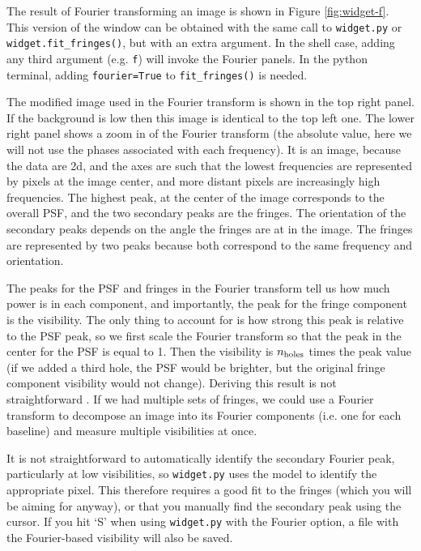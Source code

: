 \documentclass[11pt]{article}
\begin{document}
The result of Fourier transforming an image is shown in Figure \ref{fig:widget-f}. This version of the window can be obtained with the same call to \texttt{widget.py} or \texttt{widget.fit\_fringes()}, but with an extra argument. In the shell case, adding any third argument (e.g. \texttt{f}) will invoke the Fourier panels. In the python terminal, adding \texttt{fourier=True} to \texttt{fit\_fringes()} is needed.

The modified image used in the Fourier transform is shown in the top right panel. If the background is low then this image is identical to the top left one. The lower right panel shows a zoom in of the Fourier transform (the absolute value, here we will not use the phases associated with each frequency). It is an image, because the data are 2d, and the axes are such that the lowest frequencies are represented by pixels at the image center, and more distant pixels are increasingly high frequencies. The highest peak, at the center of the image corresponds to the overall PSF, and the two secondary peaks are the fringes. The orientation of the secondary peaks depends on the angle the fringes are at in the image. The fringes are represented by two peaks because both correspond to the same frequency and orientation.

The peaks for the PSF and fringes in the Fourier transform tell us how much power is in each component, and importantly, the peak for the fringe component is the visibility. The only thing to account for is how strong this peak is relative to the PSF peak, so we first scale the Fourier transform so that the peak in the center for the PSF is equal to 1. Then the visibility is $n_{\rm holes}$ times the peak value (if we added a third hole, the PSF would be brighter, but the original fringe component visibility would not change). Deriving this result is not straightforward \citep[e.g.][section 2.4.3]{2011psi..book.....G}. If we had multiple sets of fringes, we could use a Fourier transform to decompose an image into its Fourier components (i.e. one for each baseline) and measure multiple visibilities at once.

It is not straightforward to automatically identify the secondary Fourier peak, particularly at low visibilities, so \texttt{widget.py} uses the model to identify the appropriate pixel. This therefore requires a good fit to the fringes (which you will be aiming for anyway), or that you manually find the secondary peak using the cursor. If you hit `S' when using \texttt{widget.py} with the Fourier option, a file with the Fourier-based visibility will also be saved.
\end{document}
